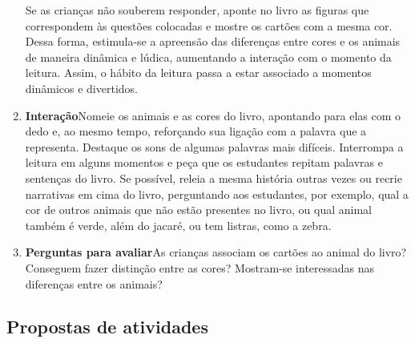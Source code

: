 \documentclass[11pt]{extarticle}
\begin{document}
\begin{enumerate}
Se as crianças não souberem responder, aponte no livro as figuras que correspondem às questões colocadas e mostre os cartões com a mesma cor. 
Dessa forma, estimula-se a apreensão das diferenças entre cores e os animais de maneira dinâmica e lúdica, aumentando a interação com o momento da leitura. Assim, o hábito da leitura passa a estar associado a momentos dinâmicos e divertidos.


\item \textbf{Interação}\quad Nomeie os animais e as cores
do livro, apontando para elas com o dedo e, ao mesmo tempo, reforçando sua ligação com a palavra que a representa. 
Destaque os sons de algumas 
palavras mais difíceis. Interrompa a leitura em alguns momentos e peça que 
os estudantes repitam palavras e sentenças do livro. Se possível, 
releia a mesma história outras vezes ou recrie narrativas em cima do livro, perguntando aos estudantes, por exemplo, qual a cor de outros animais que não estão presentes no livro, ou qual animal também é verde, além do jacaré, ou tem listras, como a zebra.

\item \textbf{Perguntas para avaliar}\quad As crianças associam os cartões ao animal do livro? Conseguem fazer distinção entre as cores? Mostram-se interessadas nas diferenças entre os animais?
\end{enumerate}


\subsection{Propostas de atividades}

\end{document}
